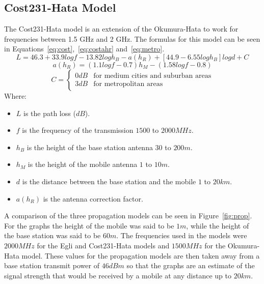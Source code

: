 \subsection{Cost231-Hata Model}
The Cost231-Hata model is an extension of the Okumura-Hata to work for frequencies between 1.5 GHz and 2 GHz. The formulas for this model can be seen in Equations~\ref{eq:cost},~\ref{eq:costahr} and~\ref{eq:metro}.
\begin{equation}\label{eq:cost}
L=46.3+33.9logf-13.82log{h_{B}}-a(h_{R})+[44.9-6.55log{h_{B}}]log{d}+C
\end{equation}
\begin{equation}\label{eq:costahr}
a(h_{R})=(1.1log{f}-0.7)h_{M}-(1.58log{f}-0.8)
\end{equation}
\begin{equation}\label{eq:metro}
C=
	\begin{cases}
	0 dB & \mbox{for medium cities and suburban areas} \\
	3 dB & \mbox{for metropolitan areas}
	\end{cases}
\end{equation}
Where:
\begin{itemize}
\item $L$ is the path loss ($dB$).
\item $f$ is the frequency of the transmission $1500$ to $2000 MHz$.
\item $h_{B}$ is the height of the base station antenna $30$ to $200 m$.
\item $h_{M}$ is the height of the mobile antenna $1$ to $10 m$.
\item $d$ is the distance between the base station and the mobile $1$ to $20 km$.
\item $a(h_{R})$ is the antenna correction factor.
\end{itemize}
A comparison of the three propagation models can be seen in Figure~\ref{fig:prop}. For the graphs the height of the mobile was said to be $1 m$, while the height of the base station was said to be $60 m$. The frequencies used in the models were $2000 MHz$ for the Egli and Cost231-Hata models and $1500 MHz$ for the Okumura-Hata model. These values for the propagation models are then taken away from a base station transmit power of $46 dBm$ so that the graphs are an estimate of the signal strength that would be received by a mobile at any distance up to $20 km$.

